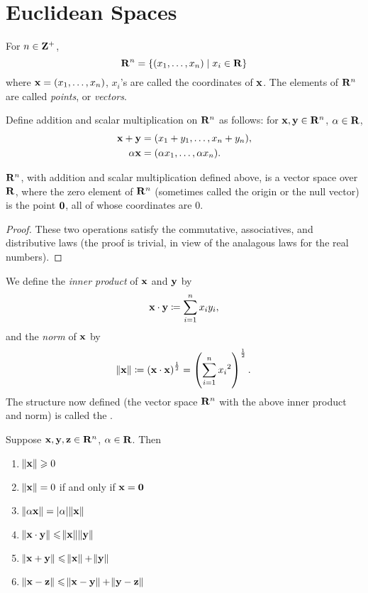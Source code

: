 \section{Euclidean Spaces}
For $n\in\mathbf Z^+$, 
\[\mathbf R^n=\{(x_1,\dots,x_n)\mid x_i\in\mathbf R\}\]
where $\vb{x}=(x_1,\dots,x_n)$, $x_i$'s are called the coordinates of $\vb{x}$. The elements of $\mathbf R^n$ are called \emph{points}, or \emph{vectors}.

Define addition and scalar multiplication on $\mathbf R^n$ as follows: for $\vb{x},\vb{y}\in\mathbf R^n$, $\alpha\in\mathbf R$,
\begin{align*}
\vb{x}+\vb{y}&=(x_1+y_1,\dots,x_n+y_n),\\
\alpha\vb{x}&=(\alpha x_1,\dots,\alpha x_n).
\end{align*}

\begin{proposition}
$\mathbf R^n$, with addition and scalar multiplication defined above, is a vector space over $\mathbf R$, where the zero element of $\mathbf R^n$ (sometimes called the origin or the null vector) is the point $\vb{0}$, all of whose coordinates are $0$.
\end{proposition}

\begin{proof}
These two operations satisfy the commutative, associatives, and distributive laws (the proof is trivial, in view of the analagous laws for the real numbers).
\end{proof}

We define the \emph{inner product} of $\vb{x}$ and $\vb{y}$ by
\[\vb{x}\cdot\vb{y}\coloneqq\sum_{i=1}^nx_iy_i,\]
and the \emph{norm} of $\vb{x}$ by
\[\norm{\vb{x}}\coloneqq\left(\vb{x}\cdot\vb{x}\right)^\frac{1}{2}=\left(\sum_{i=1}^n{x_i}^2\right)^\frac{1}{2}.\]
The structure now defined (the vector space $\mathbf R^n$ with the above inner product and norm) is called the .

\begin{proposition}
Suppose $\vb{x},\vb{y},\vb{z}\in\mathbf R^n$, $\alpha\in\mathbf R$. Then
\begin{enumerate}[label=(\roman*)]
\item $\norm{\vb{x}}\geqslant0$
\item $\norm{\vb{x}}=0$ if and only if $\vb{x}=\vb{0}$
\item $\norm{\alpha\vb{x}}=|\alpha|\norm{\vb{x}}$
\item $\norm{\vb{x}\cdot\vb{y}}\leqslant\norm{\vb{x}}\norm{\vb{y}}$
\item $\norm{\vb{x}+\vb{y}}\leqslant\norm{\vb{x}}+\norm{\vb{y}}$
\item $\norm{\vb{x}-\vb{z}}\leqslant\norm{\vb{x}-\vb{y}}+\norm{\vb{y}-\vb{z}}$
\end{enumerate}
\end{proposition}

